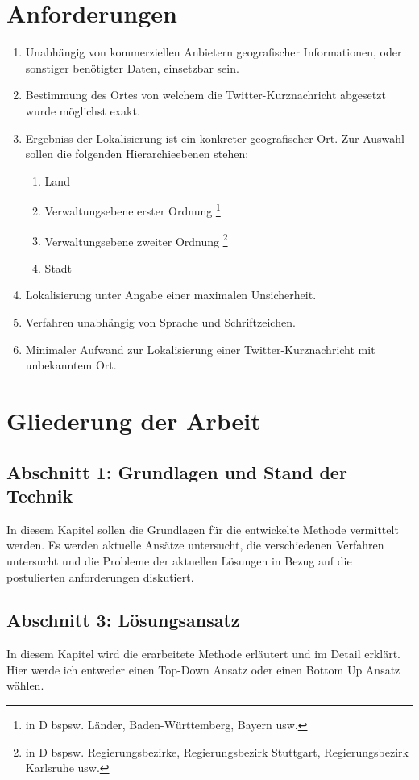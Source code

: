 	\section{Anforderungen}
		\begin{enumerate}
			\item Unabhängig von kommerziellen Anbietern geografischer Informationen, oder sonstiger benötigter Daten, einsetzbar sein.
			\item Bestimmung des Ortes von welchem die Twitter-Kurznachricht abgesetzt wurde möglichst exakt.
			\item Ergebniss der Lokalisierung ist ein konkreter geografischer Ort. Zur Auswahl sollen die folgenden Hierarchieebenen stehen: 
			\begin{enumerate}
			 	\item Land
			 	\item Verwaltungsebene erster Ordnung \footnote{in D bspsw. Länder, Baden-Württemberg, Bayern usw. }
			 	\item Verwaltungsebene zweiter Ordnung \footnote{in D bspsw. Regierungsbezirke, Regierungsbezirk Stuttgart, Regierungsbezirk Karlsruhe usw.}
			 	\item Stadt
			 \end{enumerate} 
			\item Lokalisierung unter Angabe einer maximalen Unsicherheit. 
			\item Verfahren unabhängig von Sprache und Schriftzeichen.
			\item Minimaler Aufwand zur Lokalisierung einer Twitter-Kurznachricht mit unbekanntem Ort.
		\end{enumerate}
		
	\section{Gliederung der Arbeit}

		\subsection*{Abschnitt 1: Grundlagen und Stand der Technik}
			In diesem Kapitel sollen die Grundlagen für die entwickelte Methode vermittelt werden. 
			Es werden aktuelle Ansätze untersucht, die verschiedenen Verfahren untersucht und die Probleme der aktuellen Lösungen in Bezug auf die postulierten anforderungen diskutiert. 

		\subsection*{Abschnitt 3: Lösungsansatz}
			In diesem Kapitel wird die erarbeitete Methode erläutert und im Detail erklärt. 
			Hier werde ich entweder einen Top-Down Ansatz oder einen Bottom Up Ansatz wählen.

